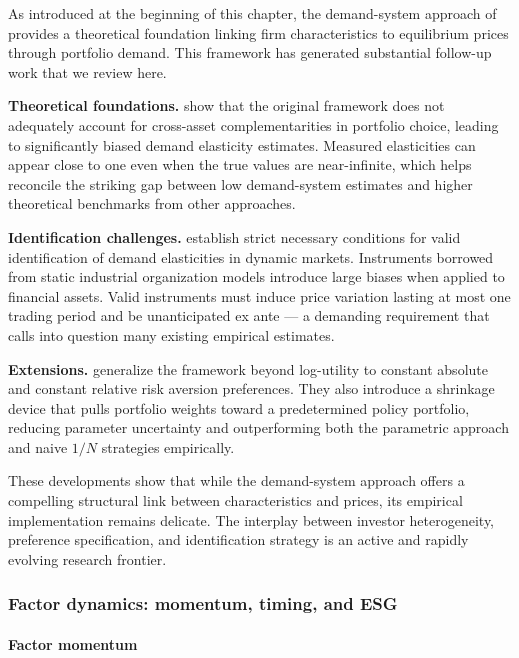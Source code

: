 As introduced at the beginning of this chapter, the demand-system approach of \cite{koijen2019demand} provides a theoretical foundation linking firm characteristics to equilibrium prices through portfolio demand. This framework has generated substantial follow-up work that we review here.

\textbf{Theoretical foundations.} \cite{fuchs2025demand} show that the original framework does not adequately account for cross-asset complementarities in portfolio choice, leading to significantly biased demand elasticity estimates. Measured elasticities can appear close to one even when the true values are near-infinite, which helps reconcile the striking gap between low demand-system estimates and higher theoretical benchmarks from other approaches.

\textbf{Identification challenges.} \cite{vanbinsbergen2025identification} establish strict necessary conditions for valid identification of demand elasticities in dynamic markets. Instruments borrowed from static industrial organization models introduce large biases when applied to financial assets. Valid instruments must induce price variation lasting at most one trading period and be unanticipated ex ante --- a demanding requirement that calls into question many existing empirical estimates.

\textbf{Extensions.} \cite{gehrig2024extending} generalize the framework beyond log-utility to constant absolute and constant relative risk aversion preferences. They also introduce a shrinkage device that pulls portfolio weights toward a predetermined policy portfolio, reducing parameter uncertainty and outperforming both the parametric approach and naive $1/N$ strategies empirically.

These developments show that while the demand-system approach offers a compelling structural link between characteristics and prices, its empirical implementation remains delicate. The interplay between investor heterogeneity, preference specification, and identification strategy is an active and rapidly evolving research frontier.

\subsubsection{Factor dynamics: momentum, timing, and ESG}

\paragraph{Factor momentum}

